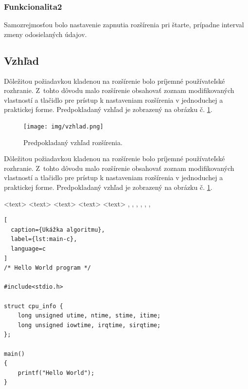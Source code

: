 \subsubsection{Funkcionalita2}
\noindent Samozrejmosťou bolo nastavenie zapnutia rozšírenia pri štarte, prípadne interval zmeny odosielaných údajov.

\subsection{Vzhľad}
\noindent Dôležitou požiadavkou kladenou na rozšírenie bolo príjemné používateľské rozhranie. Z~tohto dôvodu malo rozšírenie obsahovať zoznam modifikovaných vlastností a tlačidlo pre prístup k nastaveniam rozšírenia v jednoduchej a praktickej forme. Predpokladaný vzhľad je zobrazený na obrázku č. \ref{vzhladobr}.
\begin{figure}[!htbp]
  \centering
  \texttt{[image: img/vzhlad.png]}
  \caption{Predpokladaný vzhľad rozšírenia.}
  \label{vzhladobr}
\end{figure}	 
\noindent Dôležitou požiadavkou kladenou na rozšírenie bolo príjemné používateľské rozhranie.\cite{t00} Z~tohto dôvodu malo rozšírenie obsahovať zoznam modifikovaných vlastností a tlačidlo pre prístup k nastaveniam rozšírenia v jednoduchej a praktickej forme. Predpokladaný vzhľad je zobrazený na obrázku č. \ref{vzhladobr}.

\begin{algorithm}
\scriptsize
\begin{algorithmic}
 \STATE <text>
   \ELSE {} \ENDIF
     \ENDIF
   \ENDFOR
   \ENDFOR
   \ENDFOR
   \ENDWHILE
 \REPEAT {} 
 \LOOP {} \ENDLOOP
 \REQUIRE <text>
 \ENSURE <text>
 \RETURN <text>
 \PRINT <text>
 \AND, \OR, \XOR, \NOT, \TO, \TRUE, \FALSE
\end{algorithmic}
\caption{Ukážka príkazov pre algorithmic}  
\label{alg:preview}  
\end{algorithm}

\begin{lstlisting}[
  caption={Ukážka algoritmu},
  label={lst:main-c},
  language=c
]
/* Hello World program */

#include<stdio.h>

struct cpu_info {
    long unsigned utime, ntime, stime, itime;
    long unsigned iowtime, irqtime, sirqtime;
};

main()
{
    printf("Hello World");
}
\end{lstlisting}
